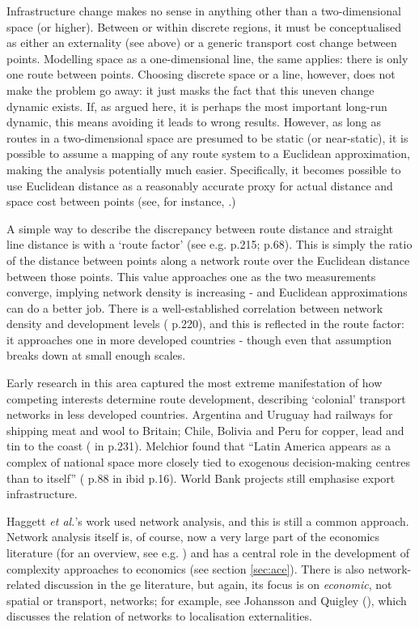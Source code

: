 {Infrastructure change makes no sense in anything other than a two-dimensional space (or higher). Between or within discrete regions, it must be conceptualised as either an externality (see above) or a generic transport cost change between points. Modelling space as a one-dimensional line, the same applies: there is only one route between points. Choosing discrete space or a line, however, does not make the problem go away: it just masks the fact that this uneven change dynamic exists. If, as argued here, it is perhaps the most important long-run dynamic, this means avoiding it leads to wrong results. However, as long as routes in a two-dimensional space are presumed to be static (or near-static), it is possible to assume a mapping of any route system to a Euclidean approximation, making the analysis potentially much easier. Specifically, it becomes possible to use Euclidean distance as a reasonably accurate proxy for actual distance and space cost between points (see, for instance, \citealt{cooper_use_1983}.) 

A simple way to describe the discrepancy between route distance and straight line distance is with a `route factor' (see e.g. \citealt{chapman_people_1979} p.215; \citealt{black_transportation:_2003} p.68). This is simply the ratio of the distance between points along a network route over the Euclidean distance between those points. This value approaches one as the two measurements converge, implying network density is increasing - and Euclidean approximations can do a better job. There is a well-established correlation between network density and development levels (\citealt{chapman_people_1979} p.220), and this is reflected in the route factor: it approaches one in more developed countries  - though even that assumption breaks down at small enough scales.

Early research in this area captured the most extreme manifestation of how competing interests determine route development, describing `colonial' transport networks in less developed countries. Argentina and Uruguay had railways for shipping meat and wool to Britain; Chile, Bolivia and Peru for copper, lead and tin to the coast (\citealt{gilbert_latin_1974} in \citealt{chapman_people_1979} p.231). Melchior found that ``Latin America appears as a complex of national space more closely tied to exogenous decision-making centres than to itself'' (\citealt{ melchior_integration_1972} p.88 in ibid p.16). World Bank projects still emphasise export infrastructure. 

Haggett \emph{et al.}'s work used network analysis, and this is still a common approach. Network analysis itself is, of course, now a very large part of the economics literature (for an overview, see e.g. \citealt{goyal_connections:_2009}) and has a central role in the development of complexity approaches to economics (see section \ref{sec:ace}). There is also network-related discussion in the \gls{ge} literature, but again, its focus is on \emph{economic}, not spatial or transport, networks; for example, see Johansson and Quigley (\citeyear{johansson_agglomeration_2003}), which discusses the relation of networks to localisation externalities.

}

